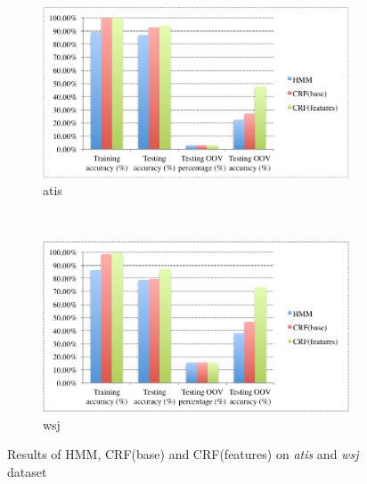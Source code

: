 \documentclass[winfonts,UTF8]{article}
\begin{document}
\begin{enumerate}
\begin{figure}[h]
\centering
\begin{subfigure}[b]{0.45\textwidth}
\includegraphics[width=\textwidth]{res1.pdf}
\caption{atis}
\label{fig:res_atis}
\end{subfigure}
~
\begin{subfigure}[b]{0.45\textwidth}
\includegraphics[width=\textwidth]{res2.pdf}
\caption{wsj}
\label{fig:res_wsj}
\end{subfigure}
\caption{Results of HMM, CRF(base) and CRF(features) on \emph{atis} and \emph{wsj} dataset}
\label{fig:res}
\end{figure}




\end{enumerate}
\end{document}
